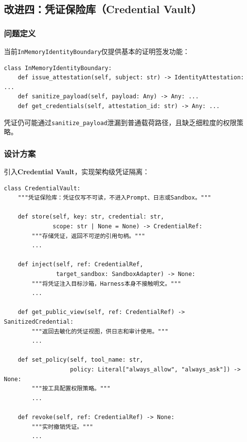 \documentclass[12pt,a4paper]{ctexart}
\begin{document}
\subsection{改进四：凭证保险库（Credential Vault）}

\subsubsection{问题定义}

当前\texttt{InMemoryIdentityBoundary}仅提供基本的证明签发功能：

\begin{lstlisting}[caption={当前最小化身份边界}]
class InMemoryIdentityBoundary:
    def issue_attestation(self, subject: str) -> IdentityAttestation: ...
    def sanitize_payload(self, payload: Any) -> Any: ...
    def get_credentials(self, attestation_id: str) -> Any: ...
\end{lstlisting}

凭证仍可能通过\texttt{sanitize\_payload}泄漏到普通载荷路径，且缺乏细粒度的权限策略。

\subsubsection{设计方案}

引入\textbf{Credential Vault}，实现架构级凭证隔离：

\begin{lstlisting}[caption={凭证保险库设计}]
class CredentialVault:
    """凭证保险库：凭证仅写不可读，不进入Prompt、日志或Sandbox。"""

    def store(self, key: str, credential: str,
              scope: str | None = None) -> CredentialRef:
        """存储凭证，返回不可逆的引用句柄。"""
        ...

    def inject(self, ref: CredentialRef,
               target_sandbox: SandboxAdapter) -> None:
        """将凭证注入目标沙箱，Harness本身不接触明文。"""
        ...

    def get_public_view(self, ref: CredentialRef) -> SanitizedCredential:
        """返回去敏化的凭证视图，供日志和审计使用。"""
        ...

    def set_policy(self, tool_name: str,
                   policy: Literal["always_allow", "always_ask"]) -> None:
        """按工具配置权限策略。"""
        ...

    def revoke(self, ref: CredentialRef) -> None:
        """实时撤销凭证。"""
        ...
\end{lstlisting}
\end{document}
